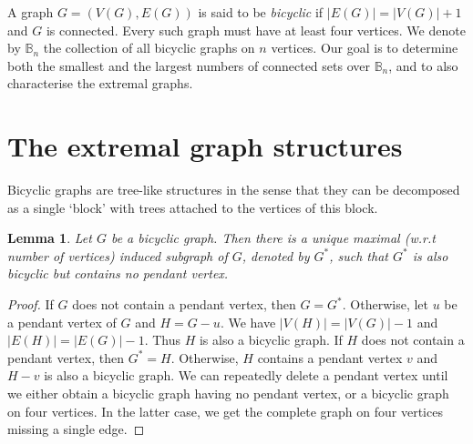 \documentclass[a4paper,12pt]{amsart}
\newtheorem{lemma}{Lemma}
\theoremstyle{remark}
\begin{document}
A graph $G=(V(G), E(G))$ is said to be \emph{bicyclic} if $|E(G)|=|V(G)|+1$ and $G$ is connected. Every such graph must have at least four vertices. We denote by $\mathbb{B}_n$ the collection of all bicyclic graphs on $n$ vertices. Our goal is to determine both the smallest and the largest numbers of connected sets over $\mathbb{B}_n$, and to also characterise the extremal graphs.



\section{The extremal graph structures}\label{Sect:Extremal}

Bicyclic graphs are tree-like structures in the sense that they can be decomposed as a single `block' with trees attached to the vertices of this block.

\begin{lemma}\label{Gstar}
Let $G$ be a bicyclic graph. Then there is a unique maximal (w.r.t number of vertices) induced subgraph of $G$,  denoted by $G^*$, such that $G^*$ is also bicyclic but contains no pendant vertex.
\end{lemma}

\begin{proof}
If $G$ does not contain a pendant vertex, then $G=G^*$. Otherwise, let $u$ be a pendant vertex of $G$ and $H=G-u$. We have $|V(H)|=|V(G)|-1$ and $|E(H)|=|E(G)|-1$. Thus $H$ is also a bicyclic graph. If $H$ does not contain a pendant vertex, then $G^*=H$. Otherwise, $H$ contains a pendant vertex $v$ and $H-v$ is also a bicyclic graph. We can repeatedly delete a pendant vertex until we either obtain a bicyclic graph having no pendant vertex, or a bicyclic graph on four vertices. In the latter case, we get the complete graph on four vertices missing a single edge.
\end{proof}
\end{document}
